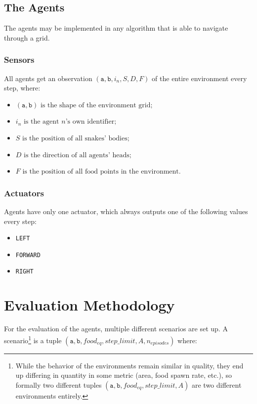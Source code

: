 \subsection{The Agents}

The agents may be implemented in any algorithm that is able to navigate through a grid.

\subsubsection{Sensors}
All agents get an observation $(\texttt{a},\texttt{b},i_n,S,D,F)$ of the entire environment every step, where:
\begin{itemize}
  \item $(\texttt{a}, \texttt{b}) \text{ is the shape of the environment grid;}$
  \item $i_n \text{ is the agent } n \text{'s own identifier;}$
  \item $S \text{ is the position of all snakes' bodies;}$
  \item $D \text{ is the direction of all agents' heads;}$
  \item $F \text{ is the position of all food points in the environment.}$
\end{itemize}

\subsubsection{Actuators}
Agents have only one actuator, which always outputs one of the following values every step:
\begin{itemize}
  \item \texttt{LEFT}
  \item \texttt{FORWARD}
  \item \texttt{RIGHT}
\end{itemize}

\section{Evaluation Methodology}
For the evaluation of the agents, multiple different scenarios are set up.
A scenario\footnote{While the behavior of the environments remain similar in quality,
they end up differing in quantity in some metric (area, food spawn rate, etc.), so formally
two different tuples $(\texttt{a},\texttt{b},food_{eq},step\_limit,A)$ are two different environments entirely.}
is a tuple $(\texttt{a},\texttt{b},food_{eq},step\_limit,A,n_{episodes})$ where:


